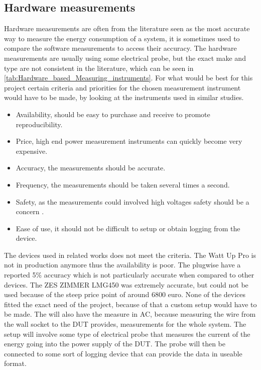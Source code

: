 \subsection{Hardware measurements} \label{sec:clampIntro}
Hardware measurements are often from the literature seen as the most accurate way to measure the energy consumption of a system, it is sometimes used to compare the software measurements to access their accuracy\cite{fahad2019comparative}. The hardware measurements are usually using some electrical probe, but the exact make and type are not consistent in the literature, which can be seen in \cref{tab:Hardware_based_Measuring_instruments}.
For what would be best for this project certain criteria and priorities for the chosen measurement instrument would have to be made, by looking at the instruments used in similar studies.
\begin{itemize}
    \item Availability, should be easy to purchase and receive to promote reproducibility.
    \item Price, high end power measurement instruments can quickly become very expensive.
    \item Accuracy, the measurements should be accurate.
    \item Frequency, the measurements should be taken several times a second.
    \item Safety, as the measurements could involved high voltages safety should be a concern \cite{sik}.
    \item Ease of use, it should not be difficult to setup or obtain logging from the device.
\end{itemize}
The devices used in related works does not meet the criteria. The Watt Up Pro is not in production anymore thus the availability is poor. The plugwise have a reported 5\% accuracy which is not particularly accurate when compared to other devices. The ZES ZIMMER LMG450 was extremely accurate, but could not be used because of the steep price point of around 6800 euro. None of the devices fitted the exact need of the project, because of that a custom setup would have to be made. The will also have the measure in AC, because measuring the wire from the wall socket to the DUT provides, measurements for the whole system.
The setup will involve some type of electrical probe that measures the current of the energy going into the power supply of the DUT. The probe will then be connected to some sort of logging device that can provide the data in useable format. 

